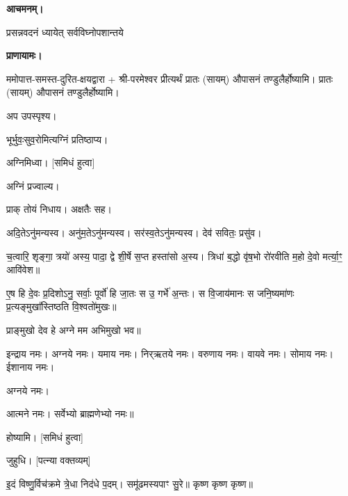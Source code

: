 
\textbf{आचमनम्।}

{प्रसन्नवदनं ध्यायेत् सर्वविघ्नोपशान्तये}
 
\textbf{प्राणायामः।} 

ममोपात्त-समस्त-दुरित-क्षयद्वारा + श्री-परमेश्वर प्रीत्यर्थं प्रातः (सायम्) औपासनं तण्डुलैर्होष्यामि। प्रातः (सायम्) औपासनं तण्डुलैर्होष्यामि।

अप उपस्पृश्य।


भूर्भुवः॒सुव॒रोमित्यग्निं प्रतिष्ठाप्य।

अग्निमिध्वा। [समिधं हुत्वा]

अग्निं प्रज्वाल्य।

प्राक् तोयं निधाय। अक्षतैः सह।

अदि॒तेऽनु॑मन्यस्व। अनु॑म॒तेऽनु॑मन्यस्व। सर॑स्व॒तेऽनु॑मन्यस्व। देव॑ सवितः॒ प्रसु॑व।


च॒त्वारि॒ शृङ्गा॒ त्रयो॑ अस्य॒ पादा॒ द्वे शी॒र्\mbox{}षे स॒प्त हस्ता॑सो अ॒स्य। त्रिधा॑ ब॒द्धो वृ॑ष॒भो रो॑रवीति म॒हो दे॒वो मर्त्या॒ꣳ॒ आवि॑वेश॥

ए॒ष हि दे॒वः प्र॒दिशोऽनु॒ सर्वाः॒ पूर्वो॑ हि जा॒तः स उ॒ गर्भे॑ अ॒न्तः। स वि॒जाय॑मानः स जनि॒ष्यमा॑णः प्र॒त्यङ्मुखा᳚स्तिष्ठति वि॒श्वतो॑मुखः॥ 

प्राङ्मुखो देव हे अग्ने मम अभिमुखो भव॥

इन्द्राय नमः। अग्नये नमः। यमाय नमः। निर्‌ऋतये नमः। 
वरुणाय नमः। वायवे नमः। सोमाय नमः। ईशानाय नमः। 

अग्नये नमः। 






आत्मने नमः। सर्वेभ्यो ब्राह्मणेभ्यो नमः॥



होष्यामि। [समिधं हुत्वा]

जुहुधि। [पत्न्या वक्तव्यम्]

इ॒दं विष्णु॒र्विच॑क्रमे त्रे॒धा निद॑धे प॒दम्। समू॑ढमस्यपाꣳ सु॒रे॥ कृष्ण कृष्ण कृष्ण॥


